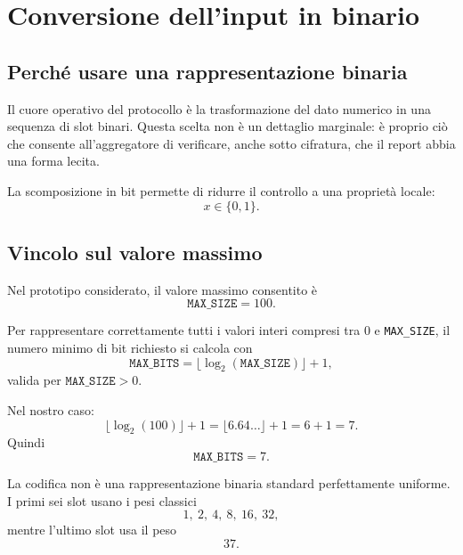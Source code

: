 \section{Conversione dell'input in binario}
\subsection{Perch\'e usare una rappresentazione binaria}
Il cuore operativo del protocollo \`e la trasformazione del dato numerico in una sequenza di slot binari. Questa scelta non \`e un dettaglio marginale: \`e proprio ci\`o che consente all'aggregatore di verificare, anche sotto cifratura, che il report abbia una forma lecita.

La scomposizione in bit permette di ridurre il controllo a una propriet\`a locale:
\begin{equation}
x \in \{0,1\}.
\end{equation}

\subsection{Vincolo sul valore massimo}
Nel prototipo considerato, il valore massimo consentito \`e
\begin{equation}
\texttt{MAX\_SIZE} = 100.
\end{equation}

Per rappresentare correttamente tutti i valori interi compresi tra $0$ e \texttt{MAX\_SIZE}, il numero minimo di bit richiesto si calcola con
\begin{equation}
\texttt{MAX\_BITS} = \lfloor \log_2(\texttt{MAX\_SIZE}) \rfloor + 1,
\end{equation}
valida per $\texttt{MAX\_SIZE} > 0$.

Nel nostro caso:
\begin{equation}
\lfloor \log_2(100) \rfloor + 1 = \lfloor 6.64\ldots \rfloor + 1 = 6 + 1 = 7.
\end{equation}
Quindi
\begin{equation}
\texttt{MAX\_BITS} = 7.
\end{equation}

La codifica non \`e una rappresentazione binaria standard perfettamente uniforme. I primi sei slot usano i pesi classici
\begin{equation}
1,\ 2,\ 4,\ 8,\ 16,\ 32,
\end{equation}
mentre l'ultimo slot usa il peso
\begin{equation}
37.
\end{equation}

